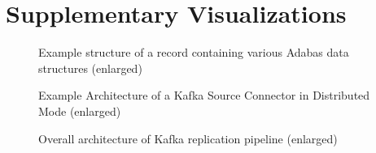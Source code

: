 \chapter{Supplementary Visualizations}

\begin{figure}[htbp]
    \centering
    \caption{Example structure of a record containing various Adabas data structures (enlarged)}
    \label{fig:appendix02:adabasstructure}
\end{figure}

\begin{figure}[htbp]
 \centering
 \caption{Example Architecture of a Kafka Source Connector in Distributed Mode (enlarged)}
 \label{fig:appendix02:kafkaconnectarchitecture}
\end{figure}

\begin{figure}[htbp]
 \centering
 \caption{Overall architecture of Kafka replication pipeline (enlarged)}
 \label{fig:appendix02:overallarchitecture}
\end{figure}

